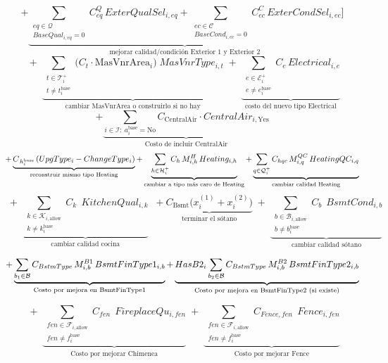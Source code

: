 \[
+\underbrace{\sum_{\substack{eq\in\mathcal{Q}\\ BaseQual_{i,eq}=0}} C^{Q}_{eq}\, ExterQualSel_{i,eq}
+\sum_{\substack{ec\in\mathcal{C}\\ BaseCond_{i,ec}=0}} C^{C}_{ec}\, ExterCondSel_{i,ec}}_{\text{mejorar calidad/condición Exterior 1 y Exterior 2}}
\Bigg]
\]
\[
\;+\;
\underbrace{\sum_{\substack{t \in \mathcal{T}^+_i \\ t \neq t_i^{\text{base}}}}
\Big( C_t \cdot \mathrm{MasVnrArea}_i \Big)\; MasVnrType_{i,t}}_{\text{cambiar MasVnrArea o construirlo si no hay}}
\;+\;
\underbrace{\sum_{\substack{e \in \mathcal{E}^+_i \\ e \neq e_i^{\text{base}}}}
C_e\, Electrical_{i,e}}_{\text{costo del nuevo tipo Electrical}}
\]
\[
+\underbrace{\sum_{i \in \mathcal{I}:\ a_i^{\text{base}} = \text{No}} C_{\text{CentralAir}} \cdot CentralAir_{i,\text{Yes}}}_{\text{Costo de incluir CentralAir}}
\]
\[
+\underbrace{C_{\,h_i^{\text{base}}}\,(UpgType_i - ChangeType_i)}_{\text{reconstruir mismo tipo Heating}}\\[4pt]
+\underbrace{\sum_{h\in\mathcal{H}_i^+} C_h\, M^H_{i,h}\, Heating_{i,h}}_{\text{cambiar a tipo más caro de Heating}}\\[4pt]
+\underbrace{\sum_{q\in\mathcal{Q}_i^+} C_{hqc}\, M^{QC}_{i,q}\, HeatingQC_{i,q}}_{\text{cambiar calidad Heating}}
\]
\[
\;+\;
\underbrace{\sum_{\substack{k \in \mathcal{K}_{i,\text{allow}} \\ k \neq k_i^{\text{base}}}}
C_k \;\, KitchenQual_{i,k}}_{\text{cambiar calidad cocina}}
\;\;
+\underbrace{C_{\text{Bsmt}}
\Big( x^{(1)}_i + x^{(2)}_i \Big)}_{\text{terminar el sótano}}
\;+\;
\underbrace{\sum_{\substack{b \in \mathcal{B}_{i,\text{allow}} \\ b \neq b_i^{\text{base}}}}
C_b \;\, BsmtCond_{i,b}}_{\text{cambiar calidad sótano}}
\]

\[
+\underbrace{\sum_{b_1\in\mathcal{B}}
C_{BstmType}\, M^{B1}_{i,b}\, BsmtFinType1_{i,b}}_{\text{Costo por mejora en BsmtFinType1}}\\[4pt]
+\underbrace{HasB2_i
\sum_{b_2\in\mathcal{B}}
C_{BstmType}\, M^{B2}_{i,b}\, BsmtFinType2_{i,b}}_{\text{Costo por mejora en BsmtFinType2 (si existe)}}
\]

\[
\;+\;
\underbrace{\sum_{\substack{fen \in \mathcal{F}_{i,\text{allow}} \\ fen \neq f_i^{\text{base}}}}
C_{fen} \;\, FireplaceQu_{i,fen}}_{\text{Costo por mejorar Chimenea}}
  \;+\;
  \underbrace{\sum_{\substack{fen \in \mathcal{F}_{i,\text{allow}} \\ fen \neq f_i^{\text{base}}}}
  C_{Fence, fen}\;\, Fence_{i,fen}}_{\text{Costo por mejorar Fence}}
  \]

